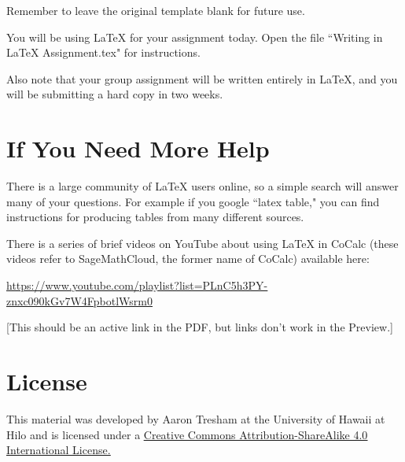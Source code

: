 \documentclass[12pt]{article}
\begin{document}
Remember to leave the original template blank for future use.

You will be using \LaTeX{} for your assignment today. Open the file ``Writing in LaTeX Assignment.tex" for instructions.

Also note that your group assignment will be written entirely in \LaTeX{}, and you will be submitting a hard copy in two weeks.

\section{If You Need More Help}

There is a large community of \LaTeX{} users online, so a simple search will answer many of your questions. For example if you google ``latex table," you can find instructions for producing tables from many different sources.

There is a series of brief videos on YouTube about using \LaTeX{} in CoCalc (these videos refer to SageMathCloud, the former name of CoCalc) available here:

{\color{blue}\underline{\url{https://www.youtube.com/playlist?list=PLnC5h3PY-znxc090kGv7W4FpbotlWsrm0}}}

[This should be an active link in the PDF, but links don't work in the Preview.]

\section{License}

This material was developed by Aaron Tresham at the University of Hawaii at Hilo and is licensed under a \href{http://creativecommons.org/licenses/by-sa/4.0/}{\color{blue}\underline{Creative Commons Attribution-ShareAlike 4.0 International License.}}
\end{document}
